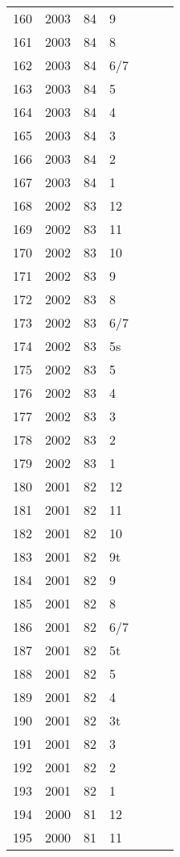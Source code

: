 \begin{longtable}{ |l|l|l|l|l|l|l| }
160 & 2003 & 84 & 9 &  &  &  \\
161 & 2003 & 84 & 8 &  &  &  \\
162 & 2003 & 84 & 6/7 &  &  &  \\
163 & 2003 & 84 & 5 &  &  &  \\
164 & 2003 & 84 & 4 &  &  &  \\
165 & 2003 & 84 & 3 &  &  &  \\
166 & 2003 & 84 & 2 &  &  &  \\
167 & 2003 & 84 & 1 &  &  &  \\
168 & 2002 & 83 & 12 &  &  &  \\
169 & 2002 & 83 & 11 &  &  &  \\
170 & 2002 & 83 & 10 &  &  &  \\
171 & 2002 & 83 & 9 &  &  &  \\
172 & 2002 & 83 & 8 &  &  &  \\
173 & 2002 & 83 & 6/7 &  &  &  \\
174 & 2002 & 83 & 5s &  &  &  \\
175 & 2002 & 83 & 5 &  &  &  \\
176 & 2002 & 83 & 4 &  &  &  \\
177 & 2002 & 83 & 3 &  &  &  \\
178 & 2002 & 83 & 2 &  &  &  \\
179 & 2002 & 83 & 1 &  &  &  \\
180 & 2001 & 82 & 12 &  &  &  \\
181 & 2001 & 82 & 11 &  &  &  \\
182 & 2001 & 82 & 10 &  &  &  \\
183 & 2001 & 82 & 9t &  &  &  \\
184 & 2001 & 82 & 9 &  &  &  \\
185 & 2001 & 82 & 8 &  &  &  \\
186 & 2001 & 82 & 6/7 &  &  &  \\
187 & 2001 & 82 & 5t &  &  &  \\
188 & 2001 & 82 & 5 &  &  &  \\
189 & 2001 & 82 & 4 &  &  &  \\
190 & 2001 & 82 & 3t &  &  &  \\
191 & 2001 & 82 & 3 &  &  &  \\
192 & 2001 & 82 & 2 &  &  &  \\
193 & 2001 & 82 & 1 &  &  &  \\
194 & 2000 & 81 & 12 &  &  &  \\
195 & 2000 & 81 & 11 &  &  &  \\

\end{longtable}
